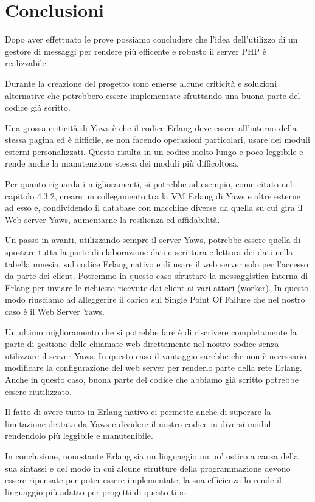 \chapter{Conclusioni}

Dopo aver effettuato le prove possiamo concludere che l'idea dell'utilizzo di un gestore di messaggi per rendere pi\`u efficente e robusto il server PHP \`e realizzabile.

Durante la creazione del progetto sono emerse alcune criticit\`a e soluzioni alternative che potrebbero essere implementate sfruttando una buona parte del codice gi\`a scritto.

Una grossa criticit\`a di Yaws \`e che il codice Erlang deve essere all'interno della stessa pagina ed \`e difficile, se non facendo operazioni particolari, usare dei moduli esterni personalizzati. Questo risulta in un codice molto lungo e poco leggibile e rende anche la manutenzione stessa dei moduli pi\`u difficoltosa.

Per quanto riguarda i miglioramenti, si potrebbe ad esempio, come citato nel capitolo 4.3.2, creare un collegamento tra la VM Erlang di Yaws e altre esterne ad esso e, condividendo il database con macchine diverse da quella su cui gira il Web server Yaws, aumentarne la resilienza ed affidabilit\`a.

Un passo in avanti, utilizzando sempre il server Yaws, potrebbe essere quella di spostare tutta la parte di elaborazione dati e scrittura e lettura dei dati nella tabella mnesia, sul codice Erlang nativo e di usare il web server solo per l'accesso da parte dei client. Potremmo in questo caso sfruttare la messaggistica interna di Erlang per inviare le richieste ricevute dai client ai vari attori (worker). In questo modo riusciamo ad alleggerire il carico sul Single Point Of Failure che nel nostro caso \`e il Web Server Yaws.

Un ultimo miglioramento che si potrebbe fare \`e di riscrivere completamente la parte di gestione delle chiamate web direttamente nel nostro codice senza utilizzare il server Yaws. In questo caso il vantaggio sarebbe che non \`e necessario modificare la configurazione del web server per renderlo parte della rete Erlang. Anche in questo caso, buona parte del codice che abbiamo gi\`a scritto potrebbe essere riutilizzato.

Il fatto di avere tutto in Erlang nativo ci permette anche di superare la limitazione dettata da Yaws e dividere il nostro codice in diversi moduli rendendolo pi\`u leggibile e manutenibile.

In conclusione, nonostante Erlang sia un linguaggio un po' ostico a causa della sua sintassi e del modo in cui alcune strutture della programmazione devono essere ripensate per poter essere implementate, la sua efficienza lo rende il linguaggio pi\`u adatto per progetti di questo tipo.


	